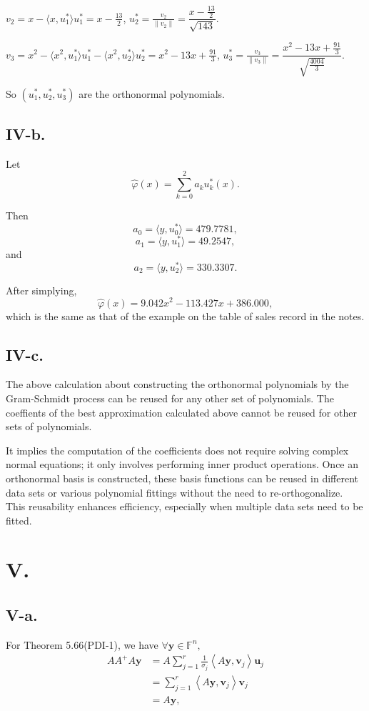 \documentclass[a4paper]{article}
\begin{document}
$v_2=x-\langle x, u_1^*\rangle u_1^*=x-\frac{13}{2}$, $u_2^*=\frac{v_2}{\| v_2\|}=\dfrac{x-\frac{13}{2}}{\sqrt{143}}$.

$v_3=x^2-\langle x^2, u_1^*\rangle u_1^*-\langle x^2, u_2^*\rangle u_2^*=x^2-13x+\frac{91}{3}$,  $u_3^*=\frac{v_3}{\| v_3\|}=\dfrac{x^2-13x+\frac{91}{3}}{\sqrt{\frac{4004}{3}}}$.

So $(u_1^*,u_2^*,u_3^*)$ are the orthonormal polynomials.

\subsection*{IV-b.}
Let 
$$
\hat{\varphi}(x)=\sum_{k=0}^2 a_k u_k^*(x).
$$

Then 
$$
a_0=\langle y, u_0^*\rangle=479.7781,
$$
$$
a_1=\langle y, u_1^*\rangle=49.2547,
$$
and
$$
a_2=\langle y, u_2^*\rangle=330.3307.
$$

After simplying, 
$$
\hat{\varphi}(x)=9.042x^2 - 113.427x + 386.000,
$$
which is the same as that of the example on the table of sales record in the notes.


\subsection*{IV-c.}
The above calculation about constructing the orthonormal polynomials by the Gram-Schmidt process can be reused for any other set of polynomials. The coeffients of the best approximation calculated above cannot be reused for other sets of polynomials.

It implies the computation of the coefficients does not require solving complex normal equations; it only involves performing inner product operations. Once an orthonormal basis is constructed, these basis functions can be reused in different data sets or various polynomial fittings without the need to re-orthogonalize. This reusability enhances efficiency, especially when multiple data sets need to be fitted.

\section*{V.}
\subsection*{V-a.}
For Theorem 5.66(PDI-1), we have $\forall\mathbf{y}\in\mathbb{F}^n,$
$$
\begin{aligned}
  AA^+A\mathbf{y}&=A\sum_{j=1}^r\frac{1}{\sigma_j}\left\langle A\mathbf{y},\mathbf{v}_j\right\rangle\mathbf{u}_j\\
  &=\sum_{j=1}^r\left\langle A\mathbf{y},\mathbf{v}_j\right\rangle\mathbf{v}_j\\
  &=A\mathbf{y},
\end{aligned}
$$
\end{document}
